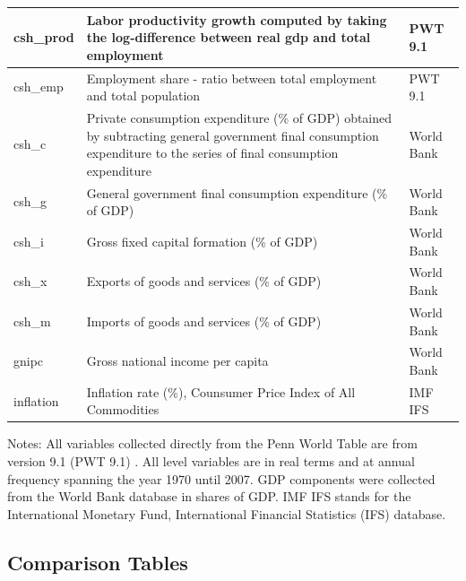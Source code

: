 \documentclass[12pt]{article}
\newcommand{\annote}[1]{\parbox{\textwidth}{\renewcommand{\baselinestretch}{1.0}\vspace{12pt} \small Notes: #1}}
\begin{document}
\begin{appendices}
\begin{table}[!htbp]
\begin{tabular}{p{2cm}p{9cm}p{3.5cm}}
 csh\_prod & Labor productivity growth computed by taking the log-difference between real gdp and total employment & PWT 9.1 \\ \hline
 csh\_emp & Employment share - ratio between total employment and total population & PWT 9.1 \\ \hline
 csh\_c & Private consumption expenditure (\% of GDP) obtained by subtracting general government final consumption expenditure to the series of final consumption expenditure & World Bank \\ \hline
 csh\_g & General government final consumption expenditure (\% of GDP) & World Bank \\ \hline
 csh\_i & Gross fixed capital formation (\% of GDP) & World Bank \\ \hline
 csh\_x & Exports of goods and services (\% of GDP) & World Bank \\ \hline
 csh\_m & Imports of goods and services (\% of GDP) & World Bank \\ \hline
 gnipc &  Gross national income per capita & World Bank \\ \hline
 inflation & Inflation rate (\%), Counsumer Price Index of All Commodities& IMF IFS \\ \hline
 
 \hline 
\end{tabular}
\annote{All variables collected directly from the Penn World Table are from version 9.1 (PWT 9.1) \cite{Feenstra2015}. All level variables are in real terms and at annual frequency spanning the year 1970 until 2007. GDP components were collected from the World Bank database in shares of GDP. IMF IFS stands for the International Monetary Fund, International Financial Statistics (IFS) database.}
\end{table}

\clearpage
\subsection{Comparison Tables}

\vspace{-1.5em}


\end{appendices}
\end{document}
